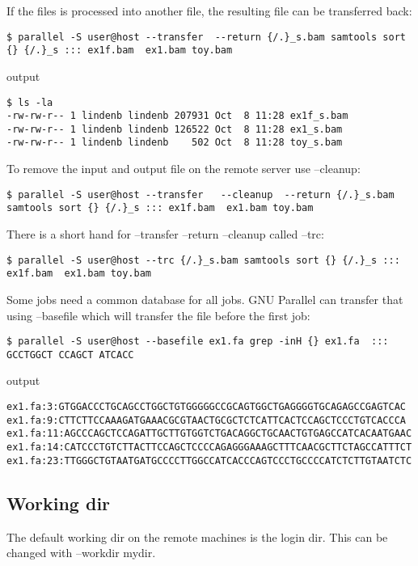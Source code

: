 \documentclass{article}
\begin{document}
If the files is processed into another file, the resulting file can be transferred back:
\begin{lstlisting}
$ parallel -S user@host --transfer  --return {/.}_s.bam samtools sort {} {/.}_s ::: ex1f.bam  ex1.bam toy.bam
\end{lstlisting}
output
\begin{lstlisting}
$ ls -la
-rw-rw-r-- 1 lindenb lindenb 207931 Oct  8 11:28 ex1f_s.bam
-rw-rw-r-- 1 lindenb lindenb 126522 Oct  8 11:28 ex1_s.bam
-rw-rw-r-- 1 lindenb lindenb    502 Oct  8 11:28 toy_s.bam
\end{lstlisting}
To remove the input and output file on the remote server use --cleanup:
\begin{lstlisting}
$ parallel -S user@host --transfer   --cleanup  --return {/.}_s.bam samtools sort {} {/.}_s ::: ex1f.bam  ex1.bam toy.bam
\end{lstlisting}

There is a short hand for --transfer --return --cleanup called --trc:
\begin{lstlisting}
$ parallel -S user@host --trc {/.}_s.bam samtools sort {} {/.}_s ::: ex1f.bam  ex1.bam toy.bam
\end{lstlisting}


Some jobs need a common database for all jobs. GNU Parallel can transfer that using --basefile which will transfer the file before the first job:
\begin{lstlisting}
$ parallel -S user@host --basefile ex1.fa grep -inH {} ex1.fa  :::  GCCTGGCT CCAGCT ATCACC
\end{lstlisting}
output
\begin{lstlisting}
ex1.fa:3:GTGGACCCTGCAGCCTGGCTGTGGGGGCCGCAGTGGCTGAGGGGTGCAGAGCCGAGTCAC
ex1.fa:9:CTTCTTCCAAAGATGAAACGCGTAACTGCGCTCTCATTCACTCCAGCTCCCTGTCACCCA
ex1.fa:11:AGCCCAGCTCCAGATTGCTTGTGGTCTGACAGGCTGCAACTGTGAGCCATCACAATGAAC
ex1.fa:14:CATCCCTGTCTTACTTCCAGCTCCCCAGAGGGAAAGCTTTCAACGCTTCTAGCCATTTCT
ex1.fa:23:TTGGGCTGTAATGATGCCCCTTGGCCATCACCCAGTCCCTGCCCCATCTCTTGTAATCTC
\end{lstlisting}
  


\subsection{Working dir}
The default working dir on the remote machines is the login dir. This can be changed with --workdir mydir.
\end{document}
